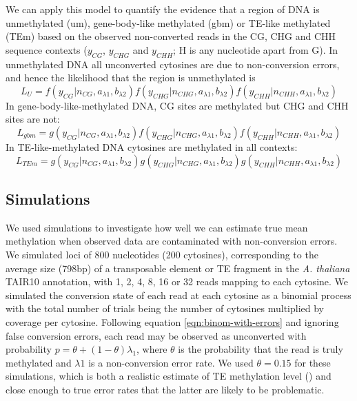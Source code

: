 \documentclass[12pt,longbibliography]{article}
\begin{document}
We can apply this model to quantify the evidence that a region of DNA is unmethylated (um), gene-body-like methylated (gbm) or TE-like methylated (TEm) based on the observed non-converted reads in the CG, CHG and CHH sequence contexts ($y_{CG}$, $y_{CHG}$ and $y_{CHH}$; H is any nucleotide apart from G).
In unmethylated DNA all unconverted cytosines are due to non-conversion errors, and hence the likelihood that the region is unmethylated is
\begin{equation}
    L_U =
    f(y_{CG}  | n_{CG},  a_{\lambda1}, b_{\lambda2})
    f(y_{CHG} | n_{CHG}, a_{\lambda1}, b_{\lambda2})
    f(y_{CHH} | n_{CHH}, a_{\lambda1}, b_{\lambda2})
\end{equation}
In gene-body-like-methylated DNA, CG sites are methylated but CHG and CHH sites are not: 
\begin{equation}
    L_{gbm} =
    g(y_{CG}  | n_{CG},  a_{\lambda1}, b_{\lambda2})
    f(y_{CHG} | n_{CHG}, a_{\lambda1}, b_{\lambda2})
    f(y_{CHH} | n_{CHH}, a_{\lambda1}, b_{\lambda2})
\end{equation}
In TE-like-methylated DNA cytosines are methylated in all contexts:
\begin{equation}
    L_{TEm} =
    g(y_{CG}  | n_{CG},  a_{\lambda1}, b_{\lambda2})
    g(y_{CHG} | n_{CHG}, a_{\lambda1}, b_{\lambda2})
    g(y_{CHH} | n_{CHH}, a_{\lambda1}, b_{\lambda2})
\end{equation}

\subsection{Simulations}

We used simulations to investigate how well we can estimate true mean methylation when observed data are contaminated with non-conversion errors.
We simulated loci of 800 nucleotides (200 cytosines), corresponding to the average size (798bp) of a transposable element or TE fragment in the \textit{A. thaliana} TAIR10 annotation, with 1, 2, 4, 8, 16 or 32 reads mapping to each cytosine.
We simulated the conversion state of each read at each cytosine as a binomial process with the total number of trials being the number of cytosines multiplied by coverage per cytosine.
Following equation \ref{eqn:binom-with-errors} and ignoring false conversion errors, each read may be observed as unconverted with probability $p=\theta + (1-\theta)\lambda_1$, where $\theta$ is the probability that the read is truly methylated and $\lambda1$ is a non-conversion error rate.
We used $\theta=0.15$ for these simulations, which is both a realistic estimate of TE methylation level (\cite{dubin2015dna}) and close enough to true error rates that the latter are likely to be problematic.
\end{document}
